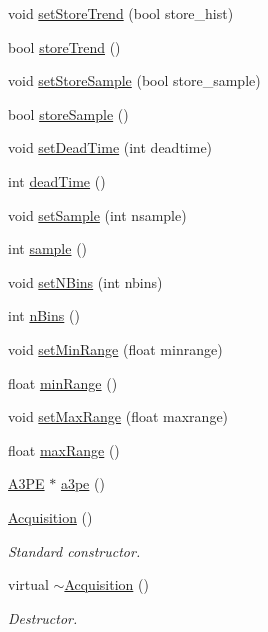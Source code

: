 \begin{DoxyCompactItemize}
\item 
void \hyperlink{classAcquisition_a1ceff272a1ad030dcd20c0dcddc65443}{set\+Store\+Trend} (bool store\+\_\+hist)
\item 
bool \hyperlink{classAcquisition_a5af693448daef6e9e054ab7f1aa50784}{store\+Trend} ()
\item 
void \hyperlink{classAcquisition_af36a1b660244096b7d274f591f67b695}{set\+Store\+Sample} (bool store\+\_\+sample)
\item 
bool \hyperlink{classAcquisition_a9af304e0fb2076cd4f92703708efe83e}{store\+Sample} ()
\item 
void \hyperlink{classAcquisition_a37e05315fc47958c290a7d938c61e067}{set\+Dead\+Time} (int deadtime)
\item 
int \hyperlink{classAcquisition_a8fb2cd60a34993ab0952d719a8517831}{dead\+Time} ()
\item 
void \hyperlink{classAcquisition_ade6fd6483b3e3737fe7dcdffb5065954}{set\+Sample} (int nsample)
\item 
int \hyperlink{classAcquisition_a83181975c0746e5837d53933031e7b62}{sample} ()
\item 
void \hyperlink{classAcquisition_a6ee040a009aa48f848b1e12434135db9}{set\+N\+Bins} (int nbins)
\item 
int \hyperlink{classAcquisition_a3a3dad0de9535d5a29c0810a5bdc3ae3}{n\+Bins} ()
\item 
void \hyperlink{classAcquisition_a8a15ffc6e539a3ae12efe4bea1ca7587}{set\+Min\+Range} (float minrange)
\item 
float \hyperlink{classAcquisition_a44f441710231748d2ca8f691647b2bcd}{min\+Range} ()
\item 
void \hyperlink{classAcquisition_a786da6cff5428020034be23e554e0e1b}{set\+Max\+Range} (float maxrange)
\item 
float \hyperlink{classAcquisition_a386f3ebc6b1d4956aa7e40b314ddb4eb}{max\+Range} ()
\item 
\hyperlink{classA3PE}{A3\+PE} $\ast$ \hyperlink{classAcquisition_a8af496b6202d2509814e3b02197a5e73}{a3pe} ()
\item 
\hyperlink{classAcquisition_aa7d3138495a4a8888c21b33f4d657732}{Acquisition} ()
\begin{DoxyCompactList}\small\item\em Standard constructor. \end{DoxyCompactList}\item 
virtual \hyperlink{classAcquisition_af697b51bd72afcfe8f9f3f368743d20d}{$\sim$\+Acquisition} ()
\begin{DoxyCompactList}\small\item\em Destructor. \end{DoxyCompactList}\item 

\end{DoxyCompactItemize}
